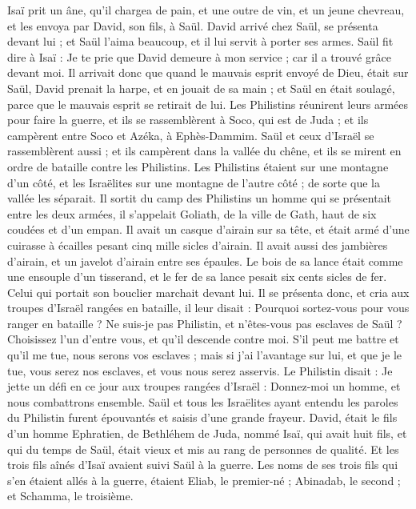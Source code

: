 \begin{multicols}{2}
Isaï prit un âne, qu’il chargea de pain, et une outre de vin, et un jeune chevreau, et les envoya par David, son fils, à Saül.
David arrivé chez Saül, se présenta devant lui ; et Saül l'aima beaucoup, et il lui servit à porter ses armes.
Saül fit dire à Isaï : Je te prie que David demeure à mon service ; car il a trouvé grâce devant moi.
Il arrivait donc que quand le mauvais esprit envoyé de Dieu, était sur Saül, David prenait la harpe, et en jouait de sa main ; et Saül en était soulagé, parce que le mauvais esprit se retirait de lui.
\VerseOne{}Les Philistins réunirent leurs armées pour faire la guerre, et ils se rassemblèrent à Soco, qui est de Juda ; et ils campèrent entre Soco et Azéka, à Ephès-Dammim.
Saül et ceux d'Israël se rassemblèrent aussi ; et ils campèrent dans la vallée du chêne, et ils se mirent en ordre de bataille contre les Philistins.
Les Philistins étaient sur une montagne d’un côté, et les Israëlites sur une montagne de l’autre côté ; de sorte que la vallée les séparait.
Il sortit du camp des Philistins un homme qui se présentait entre les deux armées, il s’appelait Goliath, de la ville de Gath, haut de six coudées et d'un empan.
Il avait un casque d'airain sur sa tête, et était armé d'une cuirasse à écailles pesant cinq mille sicles d'airain.
Il avait aussi des jambières d'airain, et un javelot d'airain entre ses épaules.
Le bois de sa lance était comme une ensouple d'un tisserand, et le fer de sa lance pesait six cents sicles de fer. Celui qui portait son bouclier marchait devant lui.
Il se présenta donc, et cria aux troupes d'Israël rangées en bataille, il leur disait : Pourquoi sortez-vous pour vous ranger en bataille ? Ne suis-je pas Philistin, et n'êtes-vous pas esclaves de Saül ? Choisissez l'un d'entre vous, et qu'il descende contre moi.
S’il peut me battre et qu'il me tue, nous serons vos esclaves ; mais si j'ai l'avantage sur lui, et que je le tue, vous serez nos esclaves, et vous nous serez asservis.
Le Philistin disait : Je jette un défi en ce jour aux troupes rangées d'Israël : Donnez-moi un homme, et nous combattrons ensemble.
Saül et tous les Israëlites ayant entendu les paroles du Philistin furent épouvantés et saisis d’une grande frayeur.
David, était le fils d'un homme Ephratien, de Bethléhem de Juda, nommé Isaï, qui avait huit fils, et qui du temps de Saül, était vieux et mis au rang de personnes de qualité.
Et les trois fils aînés d'Isaï avaient suivi Saül à la guerre. Les noms de ses trois fils qui s'en étaient allés à la guerre, étaient Eliab, le premier-né ; Abinadab, le second ; et Schamma, le troisième.

\end{multicols}
